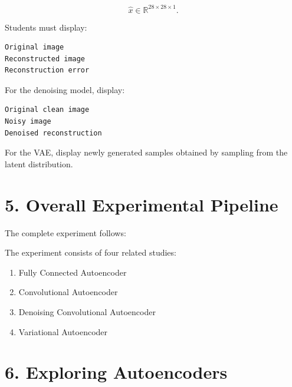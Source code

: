 \documentclass[10pt]{article}
\begin{document}
\[
\hat{x}\in\mathbb{R}^{28\times28\times1}.
\]

Students must display:

\begin{verbatim}
Original image
Reconstructed image
Reconstruction error
\end{verbatim}

For the denoising model, display:

\begin{verbatim}
Original clean image
Noisy image
Denoised reconstruction
\end{verbatim}

For the VAE, display newly generated samples obtained by sampling from the
latent distribution.

\section*{5. Overall Experimental Pipeline}

The complete experiment follows:

\begin{center}
\end{center}

The experiment consists of four related studies:

\begin{enumerate}
\item Fully Connected Autoencoder
\item Convolutional Autoencoder
\item Denoising Convolutional Autoencoder
\item Variational Autoencoder
\end{enumerate}

\section*{6. Exploring Autoencoders}
\end{document}
